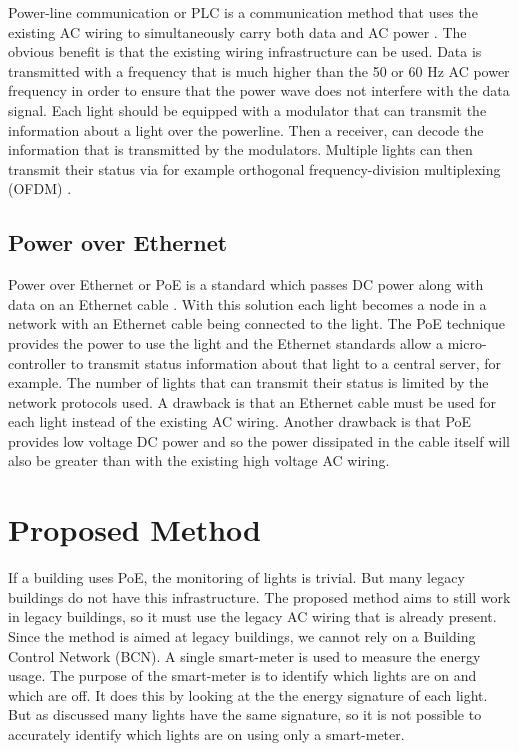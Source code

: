 		Power-line communication or PLC is a communication method that uses the existing AC wiring to simultaneously carry both data and AC power \cite{1205458}.
		The obvious benefit is that the existing wiring infrastructure can be used.
		Data is transmitted with a frequency that is much higher than the 50 or 60 Hz AC power frequency in order to ensure that the power wave does not interfere with the data signal.
		Each light should be equipped with a modulator that can transmit the information about a light over the powerline.
		Then a receiver, can decode the information that is transmitted by the modulators.
		Multiple lights can then transmit their status via for example orthogonal frequency-division multiplexing (OFDM) \cite{hoch2011comparison}.




		\subsection{Power over Ethernet}

		Power over Ethernet or PoE is a standard which passes DC power along with data on an Ethernet cable \cite{patoka2003power}.
		With this solution each light becomes a node in a network with an Ethernet cable being connected to the light.
		The PoE technique provides the power to use the light and the Ethernet standards allow a micro-controller to transmit status information about that light to a central server, for example.
		The number of lights that can transmit their status is limited by the network protocols used.
		A drawback is that an Ethernet cable must be used for each light instead of the existing AC wiring.
		Another drawback is that PoE provides low voltage DC power and so the power dissipated in the cable itself will also be greater than with the existing high voltage AC wiring.




	\section{Proposed Method}

	



	If a building uses PoE, the monitoring of lights is trivial.
	But many legacy buildings do not have this infrastructure.
	The proposed method aims to still work in legacy buildings, so it must use the legacy AC wiring that is already present.
	Since the method is aimed at legacy buildings, we cannot rely on a Building Control Network (BCN).
	A single smart-meter is used to measure the energy usage.
	The purpose of the smart-meter is to identify which lights are on and which are off.
	It does this by looking at the the energy signature of each light.
	But as discussed many lights have the same signature, so it is not possible to accurately identify which lights are on using only a smart-meter.

